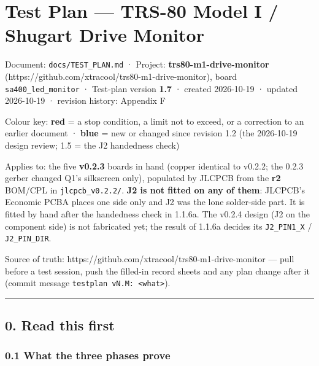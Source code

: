 \documentclass[
  10pt,
  twoside]{article}
\author{}
\date{}
\begin{document}
\hypertarget{test-plan-trs-80-model-i-shugart-drive-monitor}{%
\section{Test Plan --- TRS-80 Model I / Shugart Drive
Monitor}\label{test-plan-trs-80-model-i-shugart-drive-monitor}}

Document: \texttt{docs/TEST\_PLAN.md} · Project:
\textbf{trs80-m1-drive-monitor}
(https://github.com/xtracool/trs80-m1-drive-monitor), board
\texttt{sa400\_led\_monitor} · Test-plan version
\textbf{1.7} · created 2026-10-19 · updated 2026-10-19 ·
revision history: Appendix F

Colour key: \textcolor[HTML]{B00000}{\textbf{red} = a stop
condition, a limit not to exceed, or a correction to an
earlier document} · \textcolor[HTML]{0040A0}{\textbf{blue} =
new or changed since revision 1.2 (the 2026-10-19 design
review; 1.5 = the J2 handedness check)}

Applies to: the five \textbf{v0.2.3} boards in hand (copper
identical to v0.2.2; the 0.2.3 gerber changed Q1's
silkscreen only), populated by JLCPCB from the \textbf{r2}
BOM/CPL in \texttt{jlcpcb\_v0.2.2/}.
\textcolor[HTML]{0040A0}{\textbf{J2 is not fitted on any of
them}: JLCPCB's Economic PCBA places one side only and J2
was the lone solder-side part. It is fitted by hand after
the handedness check in 1.1.6a. The v0.2.4 design (J2 on the
component side) is not fabricated yet; the result of 1.1.6a
decides its \texttt{J2\_PIN1\_X} / \texttt{J2\_PIN\_DIR}.}

Source of truth:
https://github.com/xtracool/trs80-m1-drive-monitor --- pull
before a test session, push the filled-in record sheets and
any plan change after it (commit message
\texttt{testplan\ vN.M:\ \textless{}what\textgreater{}}).

\begin{center}\rule{0.5\linewidth}{0.5pt}\end{center}

\hypertarget{read-this-first}{%
\subsection{0. Read this first}\label{read-this-first}}

\hypertarget{what-the-three-phases-prove}{%
\subsubsection{0.1 What the three phases
prove}\label{what-the-three-phases-prove}}
\end{document}
